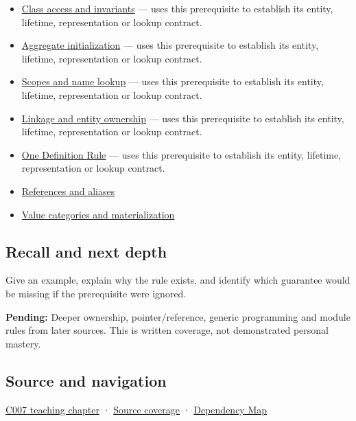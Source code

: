 \begin{itemize}
\tightlist
\item
  \hyperref[appendix-8e5214819615]{Class access and invariants} --- uses this prerequisite to establish its entity, lifetime, representation or lookup contract.
\item
  \hyperref[appendix-b7174c179542]{Aggregate initialization} --- uses this prerequisite to establish its entity, lifetime, representation or lookup contract.
\item
  \hyperref[appendix-b12b31759da1]{Scopes and name lookup} --- uses this prerequisite to establish its entity, lifetime, representation or lookup contract.
\item
  \hyperref[appendix-74a0ec818c18]{Linkage and entity ownership} --- uses this prerequisite to establish its entity, lifetime, representation or lookup contract.
\item
  \hyperref[appendix-49d27bc9d9a5]{One Definition Rule} --- uses this prerequisite to establish its entity, lifetime, representation or lookup contract.
\item
  \hyperref[appendix-d6d562ca9fbb]{References and aliases}
\item
  \hyperref[appendix-1121b30eaeb0]{Value categories and materialization}
\end{itemize}

\subsection{Recall and next depth}\label{appendix-2e4d494c2d94-recall-and-next-depth}

Give an example, explain why the rule exists, and identify which guarantee would be missing if the prerequisite were ignored.

\textbf{Pending:} Deeper ownership, pointer/reference, generic programming and module rules from later sources. This is written coverage, not demonstrated personal mastery.

\subsection{Source and navigation}\label{appendix-2e4d494c2d94-source-and-navigation}

\hyperref[01-foundations-i-ch002-promises-become-definitions]{C007 teaching chapter} · \hyperref[appendix-fd090d982a15-m007---parts-101-112]{Source coverage} · \hyperref[appendix-4ad47bdd269a]{Dependency Map}
